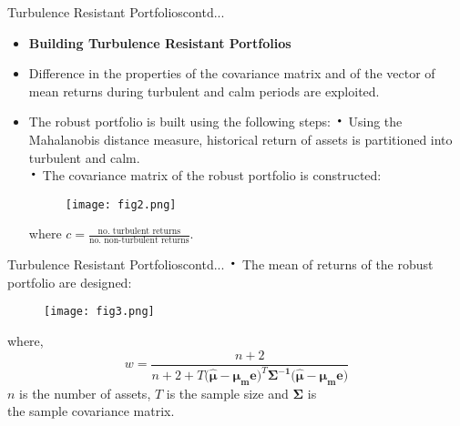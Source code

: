\documentclass{beamer}
\newcommand*{\LargerCdot}{\raisebox{-0.25ex}{\scalebox{2.3}{$\cdot$}}}
\begin{document}
\begin{frame}{Turbulence Resistant Portfolios}{contd...}
	\begin{itemize}
		\item{\textbf{Building Turbulence Resistant Portfolios}}
		\item{Difference in the properties of the \alert{covariance matrix} and of the \alert{vector of mean} returns during turbulent and calm periods are exploited.} 
		\item{The robust portfolio is built using the following steps: \newline
		$\LargerCdot$ Using the Mahalanobis distance measure, historical return of assets is partitioned into turbulent and calm.\\
		$\LargerCdot$ The covariance matrix of the robust portfolio is constructed:
	\begin{figure}{}
		\vspace*{-0.06 in}
		\scalebox{0.45}
		{\hspace*{0.6 in}\texttt{[image: fig2.png]} }
	\end{figure}
	\vspace*{-0.05 in}
	where $c = \frac{\text{no. turbulent returns}}  {\text{no. non-turbulent returns}}$.
}
\end{itemize}
\end{frame}

\begin{frame}{Turbulence Resistant Portfolios}{contd...}
	$\LargerCdot$ The mean of returns of the robust portfolio are designed: 
	\begin{figure}{}
		\vspace*{-0.1 in}
		\scalebox{0.5}
		{\hspace*{0 in}\texttt{[image: fig3.png]} }
	\end{figure}
	\vspace*{-0.3 in}
	where,$$w = \frac{n + 2}{n + 2 + T \big( \mathbf{\hat{\mu}} - \mathbf{\mu_m} \mathbf{e}\big)^{T} \mathbf{\Sigma^{-1}}\big( 			\mathbf{\hat{\mu}} - \mathbf{\mu_m} \mathbf{e}\big)}$$
	$n$ is the number of assets, $T$ is the sample size and $\mathbf{\Sigma}$ is \\the sample covariance matrix.
\end{frame}
\end{document}
